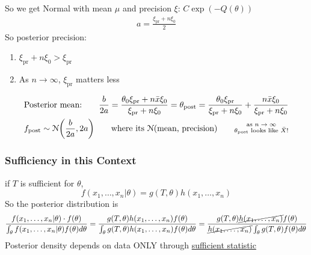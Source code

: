 So we get Normal with mean $\mu $ and precision $\xi$: $C \exp(-Q(\theta)) $
\begin{gather*}
	a = \frac{\xi_{\text{pr}} + n \xi_0}{2}
\end{gather*}
So posterior precision:
\begin{enumerate}
	\item $\xi_{\text{pr}} + n \xi_0 > \xi_{\text{pr}}$
	\item As $n \rightarrow \infty$, $\xi_{\text{pr}}$ matters less
\end{enumerate}
\begin{gather*}
	\text{Posterior mean:} \qquad \frac{b}{2a} = \frac{\theta_0 \xi_{\text{pr}} + n \bar{x} \xi_0}{\xi_{\text{pr}} + n \xi_0} = \theta_{\text{post}} = \frac{\theta_0 \xi_{\text{pr}}}{\xi_{\text{pr}} + n \xi_0} + \frac{n \bar{x} \xi_0}{\xi_{\text{pr}} + n \xi_0}\\
	f_{\text{post}} \sim \mathcal{N}\bigg(\frac{b}{2a}, 2a \bigg) \qquad \text{where its $\mathcal{N}$(mean, precision)} \qquad \substack{\text{as $n \rightarrow \infty$} \\ \text{$\theta_{\text{post}}$ looks like $\bar{X}$!}}
\end{gather*}
\subsubsection*{Sufficiency in this Context}
if $T$ is sufficient for $\theta$, 
\begin{equation*}
	f(x_1, \ldots, x_n| \theta) = g(T, \theta) h(x_1, \ldots, x_n)
\end{equation*}
So the posterior distribution is
\begin{equation*}
	\frac{f(x_1, \ldots, x_n| \theta) \cdot f(\theta)}{\int_\theta f(x_1, \ldots, x_n| \theta) f(\theta) d\theta} = \frac{g(T, \theta) h(x_1, \ldots, x_n) f(\theta)}{\int_\theta g(T, \theta) h(x_1, \ldots, x_n) f(\theta) d\theta} = \frac{g(T, \theta) \cancel{h(x_1, \ldots, x_n)} f(\theta)}{\cancel{h(x_1, \ldots, x_n)} \int_\theta g(T, \theta) f(\theta) d\theta}\\
\end{equation*}
Posterior density depends on data ONLY through \underline{sufficient statistic}